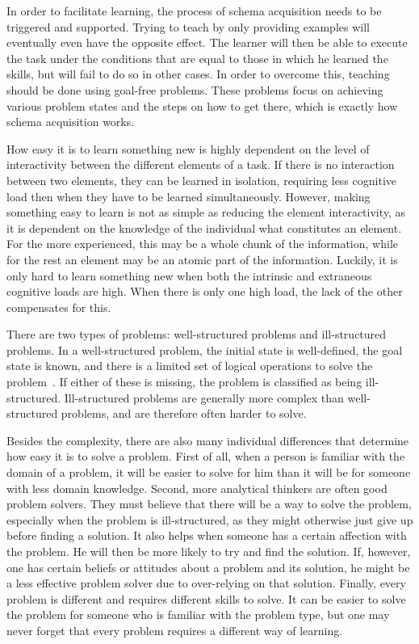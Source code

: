 In order to facilitate learning, the process of schema acquisition needs to be triggered and supported. Trying to teach by only providing examples will eventually even have the opposite effect. The learner will then be able to execute the task under the conditions that are equal to those in which he learned the skills, but will fail to do so in other cases. In order to overcome this, teaching should be done using goal-free problems. These problems focus on achieving various problem states and the steps on how to get there, which is exactly how schema acquisition works.

How easy it is to learn something new is highly dependent on the level of interactivity between the different elements of a task. If there is no interaction between two elements, they can be learned in isolation, requiring less cognitive load then when they have to be learned simultaneously. However, making something easy to learn is not as simple as reducing the element interactivity, as it is dependent on the knowledge of the individual what constitutes an element. For the more experienced, this may be a whole chunk of the information, while for the rest an element may be an atomic part of the information. Luckily, it is only hard to learn something new when both the intrinsic and extraneous cognitive loads are high. When there is only one high load, the lack of the other compensates for this.

There are two types of problems: well-structured problems and ill-structured problems. In a well-structured problem, the initial state is well-defined, the goal state is known, and there is a limited set of logical operations to solve the problem~\cite{jonassen2000toward}. If either of these is missing, the problem is classified as being ill-structured. Ill-structured problems are generally more complex than well-structured problems, and are therefore often harder to solve.

Besides the complexity, there are also many individual differences that determine how easy it is to solve a problem. First of all, when a person is familiar with the domain of a problem, it will be easier to solve for him than it will be for someone with less domain knowledge. Second, more analytical thinkers are often good problem solvers. They must believe that there will be a way to solve the problem, especially when the problem is ill-structured, as they might otherwise just give up before finding a solution. It also helps when someone has a certain affection with the problem. He will then be more likely to try and find the solution. If, however, one has certain beliefs or attitudes about a problem and its solution, he might be a less effective problem solver due to over-relying on that solution. Finally, every problem is different and requires different skills to solve. It can be easier to solve the problem for someone who is familiar with the problem type, but one may never forget that every problem requires a different way of learning.

